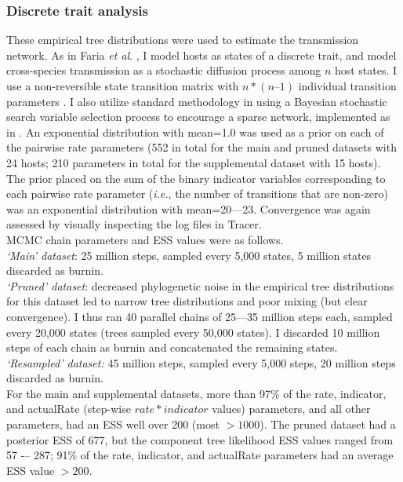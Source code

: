 \subsubsection*{Discrete trait analysis}
These empirical tree distributions were used to estimate the transmission network.
As in Faria \textit{et al}. \citep{faria2013simultaneously}, I model hosts as states of a discrete trait, and model cross-species transmission as a stochastic diffusion process among $n$ host states.
I use a non-reversible state transition matrix with $n * (n–1)$ individual transition parameters \citep{edwards2011ancient}.
I also utilize standard methodology in using a Bayesian stochastic search variable selection process to encourage a sparse network, implemented as in \citep{lemey2009bayesian}.
An exponential distribution with mean=1.0 was used as a prior on each of the pairwise rate parameters (552 in total for the main and pruned datasets with 24 hosts; 210 parameters in total for the supplemental dataset with 15 hosts).
The prior placed on the sum of the binary indicator variables corresponding to each pairwise rate parameter (\textit{i.e.}, the number of transitions that are non-zero) was an exponential distribution with mean=20---23.
Convergence was again assessed by visually inspecting the log files in Tracer.\\
MCMC chain parameters and ESS values were as follows.\\
\noindent
\textit{`Main' dataset}: 25 million steps, sampled every 5,000 states, 5 million states discarded as burnin.\\
\textit{`Pruned' dataset}: decreased phylogenetic noise in the empirical tree distributions for this dataset led to narrow tree distributions and poor mixing (but clear convergence).
I thus ran 40 parallel chains of 25---35 million steps each, sampled every 20,000 states (trees sampled every 50,000 states).
I discarded 10 million steps of each chain as burnin and concatenated the remaining states. \\
\textit{`Resampled' dataset:} 45 million steps, sampled every 5,000 steps, 20 million steps discarded as burnin. \\

For the main and supplemental datasets, more than 97\% of the rate, indicator, and actualRate (step-wise $rate*indicator$ values) parameters, and all other parameters, had an ESS well over 200 (most $> 1000$).
The pruned dataset had a posterior ESS of 677, but the component tree likelihood ESS values ranged from 57 -– 287; 91\% of the rate, indicator, and actualRate parameters had an average ESS value $> 200$.

